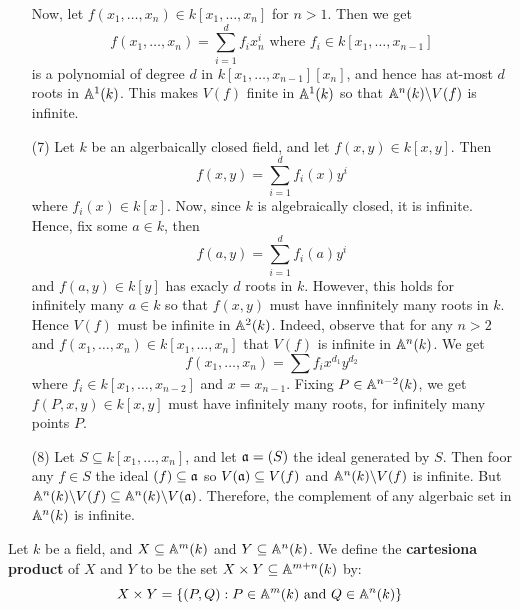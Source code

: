 \begin{example}
\begin{enumerate}
      Now, let $f(x_1, \dots, x_n) \in k[x_1, \dots, x_n]$ for $n>1$.
      Then we get
      \begin{equation*}
        f(x_1, \dots, x_n)=\sum_{i=1}^d{f_ix_n^i} \text{ where }
        f_i \in k[x_1, \dots, x_{n-1}]
      \end{equation*}
      is a polynomial of degree $d$ in $k[x_1, \dots, x_{n-1}][x_n]$,
      and hence has at-most $d$ roots in $\mathbb{A}^1(k)$. This makes $V(f)$
      finite in $\mathbb{A}^1(k)$ so that $\mathbb{A}^n(k) \backslash V(f)$ is infinite.

    \item[(7)] Let $k$ be an algerbaically closed field, and let
      $f(x,y) \in k[x,y]$. Then
      \begin{equation*}
        f(x,y)=\sum_{i=1}^d{f_i(x)y^i}
      \end{equation*}
      where $f_i(x) \in k[x]$. Now, since $k$ is algebraically closed,
      it is infinite. Hence, fix some $a \in k$, then
      \begin{equation*}
        f(a,y)=\sum_{i=1}^d{f_i(a)y^i}
      \end{equation*}
      and $f(a,y) \in k[y]$ has exacly $d$ roots in $k$. However, this
      holds for infinitely many $a \in k$ so that $f(x,y)$ must have
      innfinitely many roots in $k$. Hence $V(f)$ must be infinite in
      $\mathbb{A}^2(k)$. Indeed, observe that for any $n>2$ and $f(x_1, \dots,
      x_n) \in k[x_1, \dots, x_n]$ that $V(f)$ is infinite in
      $\mathbb{A}^n(k)$. We get
      \begin{equation*}
        f(x_1, \dots, x_n)=\sum{f_ix^{d_1}y^{d_2}}
      \end{equation*}
      where $f_i \in k[x_1, \dots, x_{n-2}]$ and $x=x_{n-1}$. Fixing
      $P \in \mathbb{A}^{n-2}(k)$, we get $f(P,x,y) \in k[x,y]$ must have
      infinitely many roots, for infinitely many points $P$.

    \item[(8)] Let $S \subseteq k[x_1, \dots, x_n]$, and let $\mathfrak{a}=(S)$
      the ideal generated by $S$. Then foor any $f \in S$ the ideal
      $(f) \subseteq \mathfrak{a}$ so $V(\mathfrak{a}) \subseteq V(f)$ and
      $\mathbb{A}^n(k) \backslash V(f)$ is infinite. But $\mathbb{A}^n(k) \backslash V(f)
      \subseteq \mathbb{A}^n(k) \backslash V(\mathfrak{a})$. Therefore, the complement of
      any algerbaic set in $\mathbb{A}^n(k)$ is infinite.
  \end{enumerate}
\end{example}

\begin{defintion}
  Let $k$ be a field, and $X \subseteq \mathbb{A}^m(k)$ and $Y \subseteq
  \mathbb{A}^n(k)$. We define the \textbf{cartesiona product} of
  $X$ and $Y$ to be the set $X \times Y \subseteq \mathbb{A}^{m+n}(k)$ by:
  \begin{equation*}
    X \times Y=\{(P,Q) : P \in \mathbb{A}^m(k) \text{ and } Q \in \mathbb{A}^n(k)\}
  \end{equation*}
\end{defintion}

